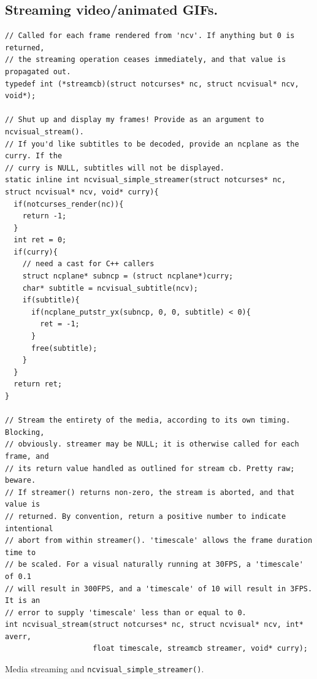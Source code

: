 \documentclass[letterpaper,10pt]{article}
\begin{document}
\subsection{Streaming video/animated GIFs.}
\begin{listing}[!htbp]
\begin{verbatim}
// Called for each frame rendered from 'ncv'. If anything but 0 is returned,
// the streaming operation ceases immediately, and that value is propagated out.
typedef int (*streamcb)(struct notcurses* nc, struct ncvisual* ncv, void*);

// Shut up and display my frames! Provide as an argument to ncvisual_stream().
// If you'd like subtitles to be decoded, provide an ncplane as the curry. If the
// curry is NULL, subtitles will not be displayed.
static inline int ncvisual_simple_streamer(struct notcurses* nc, struct ncvisual* ncv, void* curry){
  if(notcurses_render(nc)){
    return -1;
  }
  int ret = 0;
  if(curry){
    // need a cast for C++ callers
    struct ncplane* subncp = (struct ncplane*)curry;
    char* subtitle = ncvisual_subtitle(ncv);
    if(subtitle){
      if(ncplane_putstr_yx(subncp, 0, 0, subtitle) < 0){
        ret = -1;
      }
      free(subtitle);
    }
  }
  return ret;
}

// Stream the entirety of the media, according to its own timing. Blocking,
// obviously. streamer may be NULL; it is otherwise called for each frame, and
// its return value handled as outlined for stream cb. Pretty raw; beware.
// If streamer() returns non-zero, the stream is aborted, and that value is
// returned. By convention, return a positive number to indicate intentional
// abort from within streamer(). 'timescale' allows the frame duration time to
// be scaled. For a visual naturally running at 30FPS, a 'timescale' of 0.1
// will result in 300FPS, and a 'timescale' of 10 will result in 3FPS. It is an
// error to supply 'timescale' less than or equal to 0.
int ncvisual_stream(struct notcurses* nc, struct ncvisual* ncv, int* averr,
                    float timescale, streamcb streamer, void* curry);
\end{verbatim}
\caption{Media streaming and \texttt{ncvisual\_simple\_streamer()}.}
\label{list:streaming}
\end{listing}
\end{document}
